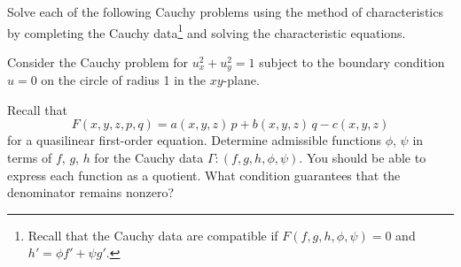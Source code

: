 \documentclass[12pt,fleqn,leqno]{exam}
\begin{document}
\begin{questions}

\question Solve each of the following Cauchy problems using the method of characteristics by completing the Cauchy data\footnote{Recall that the Cauchy data are compatible if $F(f,g,h,\phi,\psi) = 0$ and $h' = \phi f' + \psi g'$.} and solving the characteristic equations.


\question Consider the Cauchy problem for $u_x^2+u_y^2=1$ subject to the boundary condition $u = 0$ on the circle of radius 1 in the $xy$-plane.


\question Recall that \[F(x,y,z,p,q) = a(x,y,z)\,p+b(x,y,z)\,q-c(x,y,z)\] for a quasilinear first-order equation. Determine admissible functions $\phi$, $\psi$ in terms of $f$, $g$, $h$ for the Cauchy data $\Gamma: (f,g,h,\phi,\psi)$. You should be able to express each function as a quotient. What condition guarantees that the denominator remains nonzero?

\end{questions}
\end{document}
